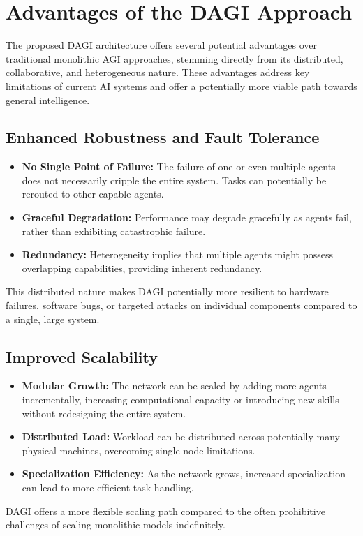 \documentclass[12pt]{amsart}
\begin{document}
\section{Advantages of the DAGI Approach}
\label{sec:advantages}

The proposed DAGI architecture offers several potential advantages over traditional monolithic AGI approaches, stemming directly from its distributed, collaborative, and heterogeneous nature. These advantages address key limitations of current AI systems and offer a potentially more viable path towards general intelligence.

\subsection{Enhanced Robustness and Fault Tolerance}
\begin{itemize}[leftmargin=*]
    \item \textbf{No Single Point of Failure:} The failure of one or even multiple agents does not necessarily cripple the entire system. Tasks can potentially be rerouted to other capable agents.
    \item \textbf{Graceful Degradation:} Performance may degrade gracefully as agents fail, rather than exhibiting catastrophic failure.
    \item \textbf{Redundancy:} Heterogeneity implies that multiple agents might possess overlapping capabilities, providing inherent redundancy.
\end{itemize}
This distributed nature makes DAGI potentially more resilient to hardware failures, software bugs, or targeted attacks on individual components compared to a single, large system.

\subsection{Improved Scalability}
\begin{itemize}[leftmargin=*]
    \item \textbf{Modular Growth:} The network can be scaled by adding more agents incrementally, increasing computational capacity or introducing new skills without redesigning the entire system.
    \item \textbf{Distributed Load:} Workload can be distributed across potentially many physical machines, overcoming single-node limitations.
    \item \textbf{Specialization Efficiency:} As the network grows, increased specialization can lead to more efficient task handling.
\end{itemize}
DAGI offers a more flexible scaling path compared to the often prohibitive challenges of scaling monolithic models indefinitely.
\end{document}
